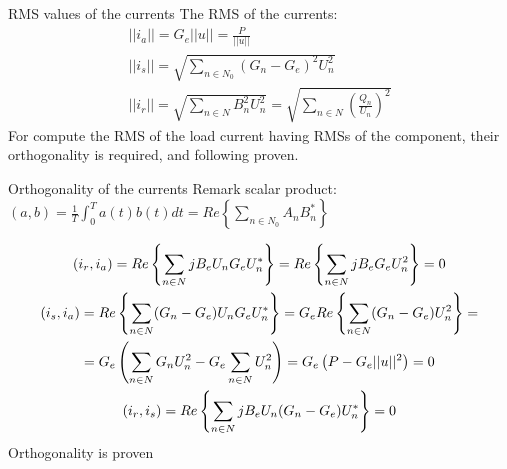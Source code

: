 \documentclass[aspectratio=169]{beamer}
\begin{document}
  \begin{frame}{RMS values of the currents}{\insertsection}
  The RMS of the currents:
      \begin{gather}
            ||i_a||=G_e||u||=\frac{P}{||u||}\\
            ||i_s||=\sqrt{\sum_{n \in N_0}(G_n-G_e)^2U_n^2}\\
            ||i_r||=\sqrt{\sum_{n\in N}B_n^2U_n^2}=\sqrt{\sum_{n\in N}\left(\frac{Q_n}{U_n}\right)^2}
      \end{gather}
      For compute the RMS of the load current having RMSs of the component, their orthogonality is required, and following proven.
  \end{frame}

  \begin{frame}{Orthogonality of the currents}{\insertsection}
    Remark scalar product: $(a,b) = \frac{1}{T}\int_{0}^{T}a(t)b(t)dt=Re\left\{\sum_{n\in N_0}A_nB_n^*\right\}$
  
    \begin{gather}
      (i_r, i_a) = Re\left\{\sum_{n \in N}jB_eU_nG_eU_n^*\right\} =  Re\left\{\sum_{n \in N}jB_eG_eU_n^2\right\} = 0\\
      (i_s, i_a) = Re\left\{\sum_{n \in N}(G_n-G_e)U_nG_eU_n^*\right\} = G_e Re\left\{\sum_{n \in N}(G_n-G_e)U_n^2\right\} = \notag\\
      = G_e\left( \sum_{n\in N}G_nU_n^2-G_e\sum_{n\in N}U_n^2\right) = G_e\left(P-G_e||u||^2\right)=0\\
      (i_r, i_s) = Re\left\{\sum_{n\in N}jB_eU_n(G_n-G_e)U_n^*\right\}=0
    \end{gather}
    Orthogonality is proven
  \end{frame}
      
\end{document}
